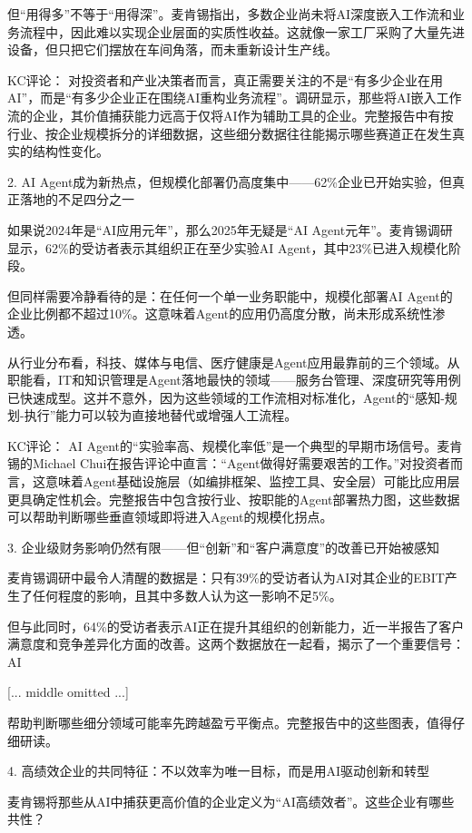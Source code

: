 \documentclass[11pt]{ctexart}
\begin{document}
但“用得多”不等于“用得深”。麦肯锡指出，多数企业尚未将AI深度嵌入工作流和业务流程中，因此难以实现企业层面的实质性收益。这就像一家工厂采购了大量先进设备，但只把它们摆放在车间角落，而未重新设计生产线。

KC评论： 对投资者和产业决策者而言，真正需要关注的不是“有多少企业在用AI”，而是“有多少企业正在围绕AI重构业务流程”。调研显示，那些将AI嵌入工作流的企业，其价值捕获能力远高于仅将AI作为辅助工具的企业。完整报告中有按行业、按企业规模拆分的详细数据，这些细分数据往往能揭示哪些赛道正在发生真实的结构性变化。

2. AI Agent成为新热点，但规模化部署仍高度集中——62\%企业已开始实验，但真正落地的不足四分之一

如果说2024年是“AI应用元年”，那么2025年无疑是“AI Agent元年”。麦肯锡调研显示，62\%的受访者表示其组织正在至少实验AI Agent，其中23\%已进入规模化阶段。

但同样需要冷静看待的是：在任何一个单一业务职能中，规模化部署AI Agent的企业比例都不超过10\%。这意味着Agent的应用仍高度分散，尚未形成系统性渗透。

从行业分布看，科技、媒体与电信、医疗健康是Agent应用最靠前的三个领域。从职能看，IT和知识管理是Agent落地最快的领域——服务台管理、深度研究等用例已快速成型。这并不意外，因为这些领域的工作流相对标准化，Agent的“感知-规划-执行”能力可以较为直接地替代或增强人工流程。

KC评论： AI Agent的“实验率高、规模化率低”是一个典型的早期市场信号。麦肯锡的Michael Chui在报告评论中直言：“Agent做得好需要艰苦的工作。”对投资者而言，这意味着Agent基础设施层（如编排框架、监控工具、安全层）可能比应用层更具确定性机会。完整报告中包含按行业、按职能的Agent部署热力图，这些数据可以帮助判断哪些垂直领域即将进入Agent的规模化拐点。

3. 企业级财务影响仍然有限——但“创新”和“客户满意度”的改善已开始被感知

麦肯锡调研中最令人清醒的数据是：只有39\%的受访者认为AI对其企业的EBIT产生了任何程度的影响，且其中多数人认为这一影响不足5\%。

但与此同时，64\%的受访者表示AI正在提升其组织的创新能力，近一半报告了客户满意度和竞争差异化方面的改善。这两个数据放在一起看，揭示了一个重要信号：AI

[... middle omitted ...]

帮助判断哪些细分领域可能率先跨越盈亏平衡点。完整报告中的这些图表，值得仔细研读。

4. 高绩效企业的共同特征：不以效率为唯一目标，而是用AI驱动创新和转型

麦肯锡将那些从AI中捕获更高价值的企业定义为“AI高绩效者”。这些企业有哪些共性？
\end{document}
